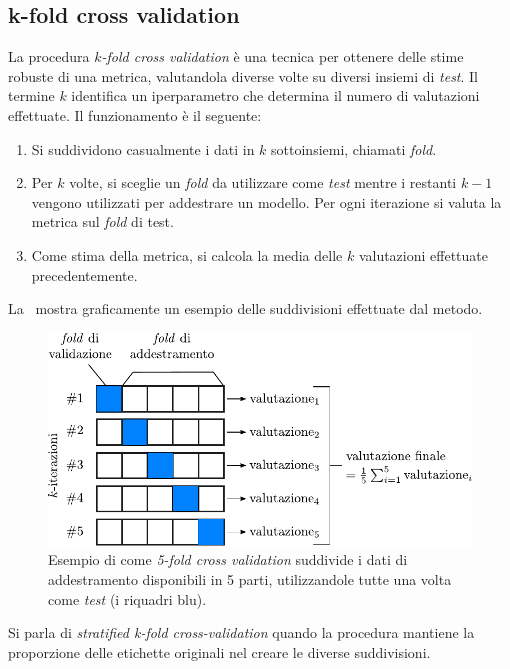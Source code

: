 \subsection{k-fold cross validation}
La procedura $k$\emph{-fold cross validation} è una tecnica per ottenere delle stime robuste di una metrica, valutandola diverse volte su diversi insiemi di \emph{test}.
Il termine $k$ identifica un iperparametro che determina il numero di valutazioni effettuate.
Il funzionamento è il seguente:
\begin{enumerate}
    \item Si suddividono casualmente i dati in $k$ sottoinsiemi, chiamati \emph{fold}.
    \item Per $k$ volte, si sceglie un \emph{fold} da utilizzare come \emph{test} mentre i restanti $k-1$ vengono utilizzati per addestrare un modello. Per ogni iterazione si valuta la metrica sul \emph{fold} di test.
    \item Come stima della metrica, si calcola la media delle $k$ valutazioni effettuate precedentemente.
\end{enumerate}
La~ mostra graficamente un esempio delle suddivisioni effettuate dal metodo.
\begin{figure}
    \centering
    \includegraphics[width=0.7\linewidth]{img/kfoldCV.pdf}
    \caption[Esempio \emph{5-fold cross-validation}.]{Esempio di come \emph{5-fold cross validation} suddivide i dati di addestramento disponibili in 5 parti, utilizzandole tutte una volta come \emph{test} (i riquadri blu).}
    \label{fig:kfoldcv}
\end{figure}
Si parla di \emph{stratified k-fold cross-validation} quando la procedura mantiene la proporzione delle etichette originali nel creare le diverse suddivisioni.


